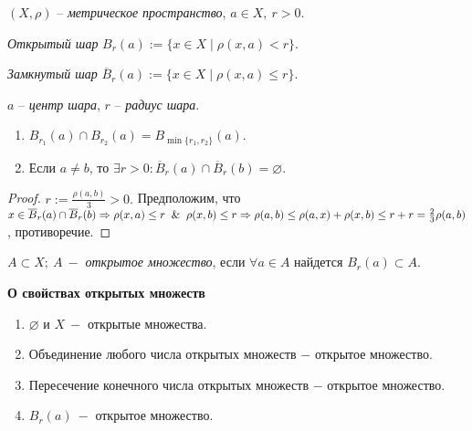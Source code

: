 \begin{definition}
    $(X,\rho)$ – \textit{метрическое пространство}, $a\in X,\ r>0$.

    \textit{Открытый шар} $B_r(a):=\{x\in X\mid \rho(x,a)<r\}$.

    \textit{Замкнутый шар} $\overline{B}_r(a):=\{x\in X\mid \rho(x,a)\leq r\}$.

    $a$ – \textit{центр шара}, $r$ – \textit{радиус шара}.
\end{definition}

\begin{proper}
    \begin{enumerate}
        \item $B_{r_1}(a)\cap B_{r_2}(a)=B_{\min\{r_1, r_2\}}(a)$.
        \item Если $a\neq b$, то $\exists r>0:\overline{B}_r(a)\cap \overline{B}_r(b)=\varnothing$.
    \end{enumerate}
\end{proper}

\begin{proof}
    $r:=\frac{\rho(a,b)}{3}>0.$ Предположим, что $x\in \overline{B}_r(a)\cap \overline{B}_r(b)\Rightarrow \rho(x,a)\leq r\And \rho(x,b)\leq r\Rightarrow \rho(a,b)\leq \rho(a,x)+\rho(x,b)\leq r+r=\frac{2}{3}\rho(a,b)$, противоречие.
\end{proof}

\begin{definition}
    $A\subset X;\ A\ -$ \textit{открытое множество}, если $\forall a\in A$ найдется $B_r(a)\subset A$.
\end{definition}

\begin{theorem}
    \textbf{О свойствах открытых множеств}

    \begin{enumerate}
        \item $\varnothing$ и $X\ -$ открытые множества.

        \item Объединение любого числа открытых множеств $-$ открытое множество.

        \item Пересечение конечного числа открытых множеств $-$ открытое множество.

        \item $B_r(a)\ -$ открытое множество.
    \end{enumerate}
\end{theorem}


